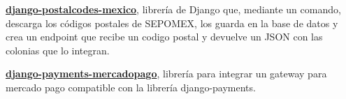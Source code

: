 

\begin{cvpubs}

  \cvpub
    {
      \begin{cvlist}
        \item {\textbf{\href{https://pypi.org/project/django-postalcodes-mexico/}{django-postalcodes-mexico}}, librería de Django que, mediante un comando, descarga los códigos postales de SEPOMEX, los guarda en la base de datos y crea un endpoint que recibe un codigo postal y devuelve un JSON con las colonias que lo integran.}
  \item {\textbf{\href{https://pypi.org/project/django-payments-mercadopago/}{django-payments-mercadopago}}, librería para integrar un gateway para mercado pago compatible con la librería django-payments. }
      \end{cvlist}
    }
\vspace{-15pt}
\end{cvpubs}
